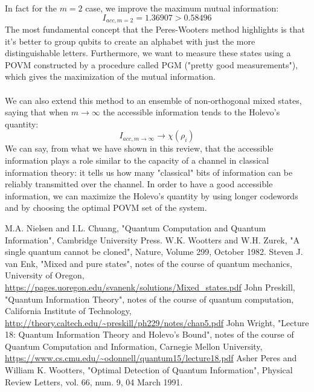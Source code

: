 \documentclass[journal, letterpaper]{IEEEtran}
\begin{document}
In fact for the $m=2$ case, we improve the maximum mutual information: 
\[I_{acc, m=2} = 1.36907 >  0.58496 \]
The most fundamental concept that the Peres-Wooters method highlights is that it's better to group qubits to create an alphabet with just the more distinguishable letters. Furthermore, we want to measure these states using a POVM constructed by a procedure called  PGM ("pretty good measurements")\cite{caltech}, which gives the maximization of the mutual information.
\\
\\We can also extend this method to an ensemble of non-orthogonal mixed states, saying that when $m\rightarrow \infty$ the accessible information tends to the Holevo's quantity: 
\[I_{acc,m\rightarrow\infty } \rightarrow \chi(\rho_i) \]
We can say, from what we have shown in this review, that the accessible information plays a role similar to the capacity of a channel in classical information theory: it tells us how many "classical" bits of information can be reliably transmitted over the channel. In order to have a good accessible information, we can maximize the Holevo's quantity by using longer codewords and by choosing the optimal POVM set of the system.


\begin{thebibliography}{3}

M.A. Nielsen and I.L. Chuang, "Quantum Computation and Quantum Information", Cambridge University Press.
W.K. Wootters and W.H. Zurek, "A single quantum cannot be cloned", Nature, Volume 299, October 1982.
Steven J. van Enk, "Mixed and pure states", notes of the course of quantum mechanics, University of Oregon, \url{https://pages.uoregon.edu/svanenk/solutions/Mixed_states.pdf}
John Preskill, "Quantum Information Theory", notes of the course of quantum computation, California Institute of Technology, \url{http://theory.caltech.edu/~preskill/ph229/notes/chap5.pdf} 
John Wright, "Lecture 18: Quantum Information Theory and Holevo’s Bound", notes of the course of Quantum Computation and Information, Carnegie Mellon University, \url{https://www.cs.cmu.edu/~odonnell/quantum15/lecture18.pdf}
Asher Peres and William K. Wootters, "Optimal Detection of Quantum Information", Physical Review Letters, vol. 66, num. 9, 04 March 1991.

\end{thebibliography}
\end{document}
